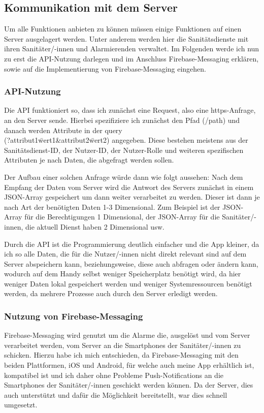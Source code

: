 \subsection{Kommunikation mit dem Server}
Um alle Funktionen anbieten zu können müssen einige Funktionen auf einen Server
ausgelagert werden. Unter anderem werden hier die Sanitätsdienste mit ihren 
Sanitäter/-innen und Alarmierenden verwaltet. Im Folgenden werde ich nun zu erst
die API-Nutzung darlegen und im Anschluss Firebase-Messaging erklären, sowie auf
die Implementierung von Firebase-Messaging eingehen.
\subsubsection{API-Nutzung}
Die API funktioniert so, dass ich zunächst eine Request, also eine https-Anfrage,
an den Server sende. Hierbei spezifiziere ich zunächst den Pfad (/path) und 
danach werden Attribute in der query \\(?attribut1\=wert1\&attribut2\=wert2) 
angegeben. Diese bestehen meistens aus der Sanitätsdienst-ID, der Nutzer-ID, 
der Nutzer-Rolle und weiteren spezifischen Attributen je nach Daten, die 
abgefragt werden sollen.

\noindent Der Aufbau einer solchen Anfrage würde dann wie folgt aussehen: 
Nach dem Empfang der Daten vom Server wird die Antwort des Servers zunächst 
in einem JSON-Array gespeichert um dann weiter verarbeitet zu werden. Dieser ist
dann je nach Art der benötigten Daten 1-3 Dimensional. Zum Beispiel ist der 
JSON-Array für die Berechtigungen 1 Dimensional, der JSON-Array für die 
Sanitäter/-innen, die aktuell Dienst haben 2 Dimensional usw.

Durch die API ist die Programmierung deutlich einfacher und die App kleiner, da
ich so alle Daten, die für die Nutzer/-innen nicht direkt relevant sind auf dem 
Server abspeichern kann, beziehungsweise, diese auch abfragen oder ändern kann,
wodurch auf dem Handy selbst weniger Speicherplatz benötigt wird, da hier weniger 
Daten lokal gespeichert werden und weniger Systemressourcen benötigt werden, da
mehrere Prozesse auch durch den Server erledigt werden.



\subsubsection{Nutzung von Firebase-Messaging}
Firebase-Messaging wird genutzt um die Alarme die, ausgelöst und vom Server
verarbeitet werden, vom Server an die Smartphones der Sanitäter/-innen zu 
schicken. Hierzu habe ich mich entschieden, da Firebase-Messaging mit den 
beiden Plattformen, iOS und Android, für welche auch meine App erhältlich ist, 
kompatibel ist und ich daher ohne Probleme Push-Notifications an die Smartphones
der Sanitäter/-innen geschickt werden können. Da der Server, dies auch 
unterstützt und dafür die Möglichkeit bereitstellt, war dies schnell umgesetzt.

